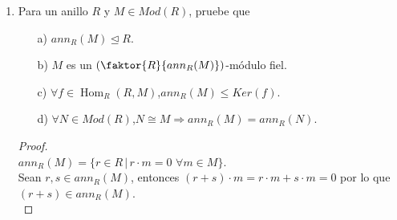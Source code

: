 \documentclass{article}
\begin{document}
\begin{enumerate}[label=\textbf{Ej \arabic*.}]
\begin{proof}
			$\boxed{\Leftarrow )}$ Sean $Q,Q' \in Mod\lrprth{R}$. Suponga que $soc\lrprth{Q} \cong soc\lrprth{Q'}$. Como $R$ es artiniano a izquierda, $soc\lrprth{Q} \hookrightarrow Q$ y $soc\lrprth{Q'} \hookrightarrow Q'$ son mono-esencial. Dado que $Q$ y $Q'$ son inyectivos, $soc\lrprth{Q} \hookrightarrow Q$ y $soc\lrprth{Q'} \hookrightarrow Q'$ son envolventes inyectivas. Ahora, puesto que $soc\lrprth{Q} \cong soc\lrprth{Q'}$, $soc\lrprth{Q} \hookrightarrow Q$ y $soc\lrprth{Q} \hookrightarrow Q'$ son envolventes inyectivas de $Q$. Usando el \textbf{Ejercicio 88.}, $Q$ y $Q'$ son inyectivos.\\
			$\therefore Q\cong Q'$
			
			$\boxed{c)}$ Como $S_{i}$ es simple, por la \textbf{Proposición 3.3.9.a)}, $I_{0}\lrprth{S_{i}}$ es inyectivo inescindible.\\
			
			Por otro lado, considere $S_{i}$, $S_{j}$ dos $R$-módulos simples no isomorfos. Entonces, por la \textbf{Proposición 3.3.9.b)}, $soc\lrprth{I_{0}\lrprth{S_{i}}} \cong S_{i}$ y $soc\lrprth{I_{0}\lrprth{S_{j}}} \cong S_{j}$. Luego, por el inciso anterior, $I_{0}\lrprth{S_{i}} \not\cong I_{0}\lrprth{S_{j}}$.\\
			
			Por último, suponga que $Q$ es inyectivo inescindible. Por la \textbf{Proposición 3.3.9.b)}, $soc\lrprth{Q} \cong S_{i}$, para algún $i \in [1,n]$. Por el inciso anterior, $Q \cong I_{0}\lrprth{S_{i}}$.\\
			$\therefore\lrbrack{I_{0}\lrprth{S_{j}}}_{j=1}^{n}$ es una familia completa de inyectivos inescindibles en $Mod\lrprth{R}$ no isomorfos dos a dos.
		\end{proof}
		
		\item Para un anillo $R$ y $M\in Mod(R)$, pruebe que 
\begin{itemize}
\item[a)] $ann_R(M)\unlhd R$.
\item[b)] $M$ es un $\left(\faktor{R}{ann_R(M)}\right)$-módulo fiel.
\item[c)] $\forall f\in \operatorname{Hom}_R(R,M)$,\quad $ann_R(M)\leq Ker(f)$.
\item[d)] $\forall N\in Mod(R)$,\quad $N\cong M\Longrightarrow ann_R(M)=ann_R(N)$.
\end{itemize}
\begin{proof}
\\
$ann_R(M)=\{r\in R\,|\,r\cdot m=0\,\,\forall m\in M\}$.\\
Sean $r,s\in ann_R(M)$, entonces $(r+s)\cdot m=r\cdot m+s\cdot m=0$ por lo que $(r+s)\in ann_R(M)$.\\


\end{proof}
\end{enumerate}
\end{document}
